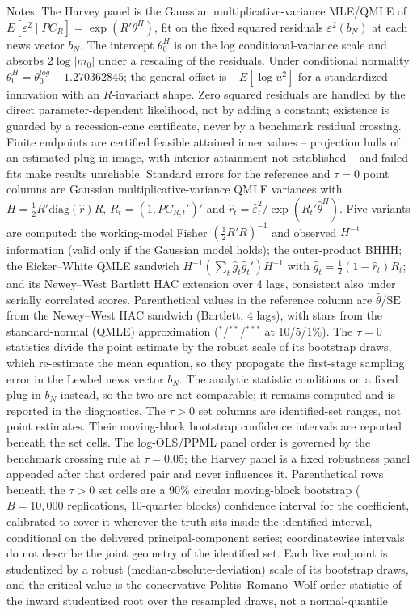 \begin{table}[!htbp]
\begin{threeparttable}
\begin{tablenotes}[flushleft]
\item Notes: The Harvey panel is the Gaussian multiplicative-variance MLE/QMLE of $E[\varepsilon^2 \mid PC_R] = \exp(R'\theta^{H})$, fit on the fixed squared residuals $\varepsilon^2(b_N)$ at each news vector $b_N$. The intercept $\theta^{H}_0$ is on the log conditional-variance scale and absorbs $2\log|m_0|$ under a rescaling of the residuals. Under conditional normality $\theta^{H}_0 = \theta^{log}_0 + 1.270362845$; the general offset is $-E[\log u^2]$ for a standardized innovation with an $R$-invariant shape. Zero squared residuals are handled by the direct parameter-dependent likelihood, not by adding a constant; existence is guarded by a recession-cone certificate, never by a benchmark residual crossing. Finite endpoints are certified feasible attained inner values -- projection hulls of an estimated plug-in image, with interior attainment not established -- and failed fits make results unreliable. Standard errors for the reference and $\tau{=}0$ point columns are Gaussian multiplicative-variance QMLE variances with $H = \frac{1}{2}R'\mathrm{diag}(\hat r)R$, $R_t = (1, PC_{R,t}')'$ and $\hat r_t = \hat\varepsilon_t^2 / \exp(R_t'\hat\theta^{H})$. Five variants are computed: the working-model Fisher $(\frac{1}{2}R'R)^{-1}$ and observed $H^{-1}$ information (valid only if the Gaussian model holds); the outer-product BHHH; the Eicker--White QMLE sandwich $H^{-1} (\sum_t \hat g_t \hat g_t')H^{-1}$ with $\hat g_t = \frac{1}{2}(1 - \hat r_t)R_t$; and its Newey--West Bartlett HAC extension over 4 lags, consistent also under serially correlated scores. Parenthetical values in the reference column are $\hat\theta/\mathrm{SE}$ from the Newey--West HAC sandwich (Bartlett, 4 lags), with stars from the standard-normal (QMLE) approximation ($^{*}$/$^{**}$/$^{***}$ at 10/5/1\%). The $\tau{=}0$ statistics divide the point estimate by the robust scale of its bootstrap draws, which re-estimate the mean equation, so they propagate the first-stage sampling error in the Lewbel news vector $b_N$. The analytic statistic conditions on a fixed plug-in $b_N$ instead, so the two are not comparable; it remains computed and is reported in the diagnostics. The $\tau{>}0$ set columns are identified-set ranges, not point estimates. Their moving-block bootstrap confidence intervals are reported beneath the set cells. The log-OLS/PPML panel order is governed by the benchmark crossing rule at $\tau{=}0.05$; the Harvey panel is a fixed robustness panel appended after that ordered pair and never influences it. Parenthetical rows beneath the $\tau{>}0$ set cells are a 90\% circular moving-block bootstrap ($B=10{,}000$ replications, 10-quarter blocks) confidence interval for the coefficient, calibrated to cover it wherever the truth sits inside the identified interval, conditional on the delivered principal-component series; coordinatewise intervals do not describe the joint geometry of the identified set. Each live endpoint is studentized by a robust (median-absolute-deviation) scale of its bootstrap draws, and the critical value is the conservative Politis--Romano--Wolf order statistic of the inward studentized root over the resampled draws, not a normal-quantile 
\end{tablenotes}
\end{threeparttable}
\end{table}
